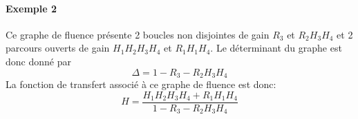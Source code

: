 \paragraph{Exemple 2}

\begin{center}
\end{center}
Ce graphe de fluence présente 2 boucles non disjointes de gain $R_3$ 
et $R_2H_3H_4$ et 2 parcours ouverts de gain $H_1H_2H_3H_4$ et $R_1H_1H_4$.
Le déterminant du graphe est donc donné par 
$$
\Delta=1-R_3-R_2H_3H_4
$$
La fonction de transfert associé à ce graphe de fluence est donc:
$$
H=\dfrac{H_1H_2H_3H_4+R_1H_1H_4}{1-R_3-R_2H_3H_4}
$$

\newpage


